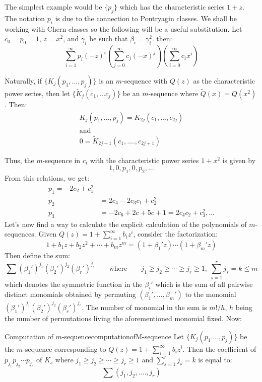 \documentclass{book}
\begin{document}
The simplest example would be $\{p_j\}$ which has the characteristic series $1+z$. The notation $p_i$ is due
to the connection to Pontryagin classes. We shall be working with Chern classes so the following will be
a useful substitution. Let $c_0 = p_0 = 1$, $z = x^2$, and $\gamma_i$ be such that $\beta_i = \gamma_i^2$.
then:
\[
  \sum_{i=1}^\infty p_i(-z)^i  \left(\sum_{j=0}^\infty c_j(-x)^j\right)\left(\sum_{i=0}^\infty c_ix^i\right)
\]

Naturally, if $\{K_j(p_1, ..., p_j)\}$ is an $m$-sequence with $Q(z)$ as the characteristic power series, then
let $\{\widetilde{K}_j(c_1, ... c_j)\}$ be an $m$-sequence where $\widetilde{Q}(x) = Q(x^2)$. Then:
\begin{gather*}
  K_j(p_1, ..., p_j) = \widetilde{K}_{2j}(c_1, ..., c_{2j})\\
                     \text{and}\\
  0 = \widetilde{K}_{2j+1}(c_1, ...., c_{2j+1})
\end{gather*}

Thus, the $m$-sequence in $c_i$ with the characteristic power series $1+x^2$ is given by
\[
  1, 0, p_1, 0, p_2, ...
\]
From this relations, we get:
\begin{align*}
  p_1 = -2c_2 + c_1^2 \\
  p_2 &= 2c_4 - 2c_3c_1 + c_2^2\\
  p_3 &= -2c_6 + 2c+5c+1 = 2c_4c_2 + c_3^2, ...
\end{align*}
Let's now find a way to calculate the explicit calculation of the polynomials of $m$-sequences. Given $Q(z)
= 1+\sum_{i=1}^\infty b_iz^i$, consider the factorization:
\[
  1 + b_1z + b_2z^2  +\cdots + b_mz^m = (1 + \beta_1'z)\cdots (1+\beta_m'z)
\]
Then define the sum:
\[
  \sum \left(\beta_1'\right)^{j_1}\left(\beta_2'\right)^{j_2}\left(\beta_r'\right)^{j_r} \qquad \text{where}
  \qquad j_1 \ge j_2 \ge \cdots \ge j_r \ge 1,\ \sum_{s=1}^r j_s = k \le m
\]
which denotes the symmetric function in the $\beta_i'$ which is the sum of all pairwise distinct monomials
obtained by permuting $(\beta_1', ..., \beta_m')$ to the monomial
$\left(\beta_1'\right)^{j_1}\left(\beta_2'\right)^{j_2}\left(\beta_r'\right)^{j_r}$. The number of monomial in
the sum is $m!/h$, $h$ being the number of permutations living the aforementioned monomial fixed. Now:

\begin{lem}{Computation of $m$-sequence}{computationofM-sequence}
  Let $\{K_j(p_1. ..., p_j)\}$ be the $m$-sequence corresponding to $Q(z) = 1 + \sum_{i=1}^\infty b_iz^i$.
  Then the coefficient of $p_{j_1}p_{j_2}\cdots p_{j_r}$ of $K_s$ where $j_1 \ge j_2 \ge \cdots \ge j_r \ge 1$
  and $\sum_{s=1}^r j_s = k$ is equal to:
  \[
    \sum (j_1, j_2, ...., j_r)
  \]
\end{lem}
\end{document}
